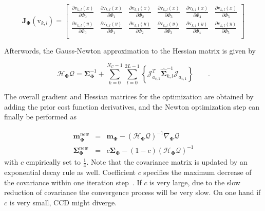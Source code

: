 \begin{equation}
  \label{eq:bigj}
\mathbf{J}_{\mathbf{\Phi}}(\mathrm{v}_{k,l}) =
\left[ {\begin{array}{cccccc}
\frac{\partial \mathrm{v}_{k,l}(x)}{\partial \Phi_0}& \frac{\partial \mathrm{v}_{k,l}(x)}{\partial \Phi_1}& \frac{\partial \mathrm{v}_{k,l}(x)}{\partial \Phi_2}& \frac{\partial \mathrm{v}_{k,l}(x)}{\partial \Phi_3}&\frac{\partial \mathrm{v}_{k,l}(x)}{\partial \Phi_4} &\frac{\partial \mathrm{v}_{k,l}(x)}{\partial \Phi_5}  \\
\frac{\partial \mathrm{v}_{k,l}(y)}{\partial \Phi_0}& \frac{\partial \mathrm{v}_{k,l}(y)}{\partial \Phi_1}& \frac{\partial \mathrm{v}_{k,l}(y)}{\partial \Phi_2}& \frac{\partial \mathrm{v}_{k,l}(y)}{\partial \Phi_3}&\frac{\partial \mathrm{v}_{k,l}(y)}{\partial \Phi_4} &\frac{\partial \mathrm{v}_{k,l}(y)}{\partial \Phi_5}  \\
 \end{array} } \right]
\end{equation}

Afterwords, the Gauss-Newton approximation to the Hessian
matrix is given by

\begin{equation}
  \label{eq:hessian}
  \mathcal{H}_{\mathbf{\Phi}} \mathcal{Q}  =
  \mathbf{\Sigma}_{\mathbf{\Phi}}^{-1} + \sum_{k = 0}^{N_{C}-1}
  \sum_{l=0}^{2L-1} \left\{\mathcal{J}_{a_{v,1}}^T\hat{\mathbf{\Sigma}}_{k,l}^{-1}\mathcal{J}_{a_{v,1}}\right\}\qquad.
\end{equation}


The overall gradient and Hessian matrices for the optimization
are obtained by adding the prior cost function
derivatives, and the Newton optimization step can finally be
performed as

\begin{eqnarray}
\label{eq:newton}
  \mathbf{m}_{\mathbf{\Phi}}^{new} & = &
  \mathbf{m}_{\mathbf{\Phi}} - (\mathcal{H}_{\mathbf{\Phi}}
  \mathcal{Q})^{-1} \nabla_{\mathbf{\Phi}} \mathcal{Q} \nonumber \\
  \mathbf{\Sigma}_{\mathbf{\Phi}}^{new} & = &
  c\mathbf{\Sigma}_{\mathbf{\Phi}} - (1-c)(\mathcal{H}_{\mathbf{\Phi}}
  \mathcal{Q})^{-1}
\end{eqnarray}
with $c$ empirically set to $\frac{1}{4}$. Note that the covariance
matrix is updated by an exponential decay rule as well. Coefficient $c$ specifies the
maximum decrease of the covariance within one iteration
step~\cite{hanek2004contracting}. If $c$ is very large, due to the slow reduction of covariance the
convergence process will be very slow. On one hand if $c$ is
very small, CCD might diverge.

